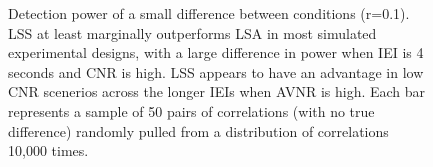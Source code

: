 \documentclass[10pt,letterpaper]{article}
\begin{document}
\begin{figure}[H]
  \centering


  \caption{
    Detection power of a small difference between conditions (r=0.1).
    LSS at least marginally outperforms LSA in most simulated experimental
    designs, with a large difference in power when IEI is 4 seconds and
    CNR is high.
    LSS appears to have an advantage in low CNR scenerios across the longer IEIs
    when AVNR is high.
    Each bar represents a sample of 50 pairs of correlations (with no true difference)
    randomly pulled from a distribution of correlations 10,000 times.
  }
  \label{fig:res_sim_smalldiff}
\end{figure}



\end{document}
